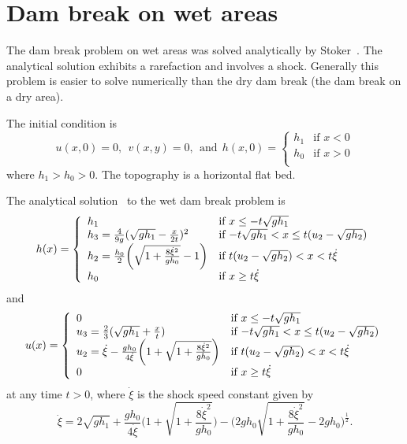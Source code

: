 
\section{Dam break on wet areas}

The dam break problem on wet areas was solved analytically by 
Stoker~\cite{Stoker1948, Stoker1957}.
The analytical solution exhibits a rarefaction and involves a shock. Generally this problem is easier to solve numerically than the dry dam break (the dam break on a dry area).

The initial condition is
\begin{equation} \label{eq:dbp_init_wet}
u(x,0)=0, ~~v(x,y)=0, ~~\textrm{and}~~
h(x,0) = \left\{ \begin{array}{ll}
h_1 & \textrm{if $x < 0$}\\
h_0 & \textrm{if $x > 0$}\\
\end{array} \right.
\end{equation}
where $h_1>h_0>0$. The topography is a horizontal flat bed.

The analytical solution~\cite{Stoker1948, Stoker1957}
to the wet dam break problem is
\begin{equation}
h(x) = \left\{ \begin{array}{ll}
h_1 & \textrm{if $x \leq -t \sqrt{gh_1}$}\\
h_3=\frac{4}{9g}(\sqrt{gh_1}-\frac{x}{2t})^2 & \textrm{if $-t \sqrt{gh_1} <x \leq t(u_2-\sqrt{gh_2}$})\\
h_2=\frac{h_0}{2}\bigg(\sqrt{1+\frac{8\dot{\xi}^2}{gh_0}}-1\bigg) & \textrm{if $ t(u_2-\sqrt{gh_2}) <x < t\dot{\xi}$}\\
h_0 & \textrm{if $x \geq t\dot{\xi}$}\\
\end{array} \right.
\end{equation}
and
\begin{equation}
u(x) = \left\{ \begin{array}{ll}
0 & \textrm{if $x \leq -t \sqrt{gh_1}$}\\
u_3=\frac{2}{3}(\sqrt{gh_1}+\frac{x}{t}) & \textrm{if $-t \sqrt{gh_1} <x \leq t(u_2-\sqrt{gh_2}$})\\
u_2=\dot{\xi}-\frac{gh_0}{4\dot{\xi}}\bigg(1+\sqrt{1+\frac{8\dot{\xi}^2}{gh_0}} \bigg) & \textrm{if $ t(u_2-\sqrt{gh_2}) <x < t\dot{\xi}$}\\
0 & \textrm{if $x \geq t\dot{\xi}$}\\
\end{array} \right.
\end{equation}
at any time $t>0$, where $\dot{\xi}$ is the shock speed constant given by 
\begin{equation} \label{eq:shock}
\dot{\xi}=2\sqrt{gh_1}+\frac{gh_0}{4\dot{\xi}}\bigg( 1+\sqrt{1+\frac{8\dot{\xi}^2}{gh_0}}\bigg)-\bigg( 2gh_0 \sqrt{1+\frac{8\dot{\xi}^2}{gh_0}}-2gh_0\bigg)^\frac{1}{2}.
\end{equation}


